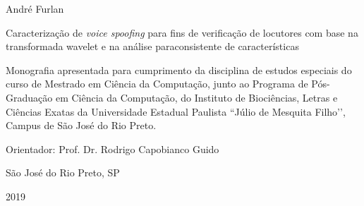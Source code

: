 \documentclass[a4paper,12pt,openright,oneside]{book}
\begin{document}
	\begin{center}

		\vspace{4cm}

		\fontsize{14}{\baselineskip} \selectfont

		\vspace{30.0pt}

		{André Furlan} \\ \vspace{30.0pt}

		{Caracterização de \textit{voice spoofing} para fins de verificação de locutores com base na transformada wavelet e na análise paraconsistente de características} \\ \onehalfspacing \fontsize{14}{\baselineskip}

		\par \null

		\begin{flushright}

		\parbox{3.50in}{

			\fontsize{12}{\baselineskip} \selectfont \onehalfspacing

			Monografia apresentada para cumprimento da disciplina de estudos especiais do curso de Mestrado em Ciência da Computação, junto ao Programa de Pós-Graduação em Ciência da Computação, do Instituto de Biociências, Letras e Ciências Exatas da Universidade Estadual Paulista ``Júlio de Mesquita Filho’’, Campus de São José do Rio Preto. \\ \vspace{1.0pt}

			{Orientador: Prof. Dr. Rodrigo Capobianco Guido } \\ \vspace{1.0pt}

		}

		\end{flushright}

		\fontsize{14}{\baselineskip} \selectfont

		\vspace{8.0cm}

		São José do Rio Preto, SP \\ \vspace{1.0pt}  

		2019

	\end{center}

	\newpage

	\thispagestyle{empty}
\end{document}
